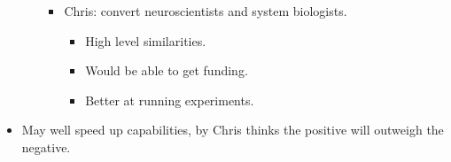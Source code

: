 \begin{itemize}
\begin{enumerate}[label=\arabic*.]
\begin{itemize}
            \item Chris: convert neuroscientists and system biologists.
            \begin{itemize}
                \item High level similarities.
                \item Would be able to get funding.
                \item Better at running experiments.
            \end{itemize}
        \end{itemize}
    \end{enumerate}
    \item May well speed up capabilities, by Chris thinks the positive will outweigh the negative.
\end{itemize}
